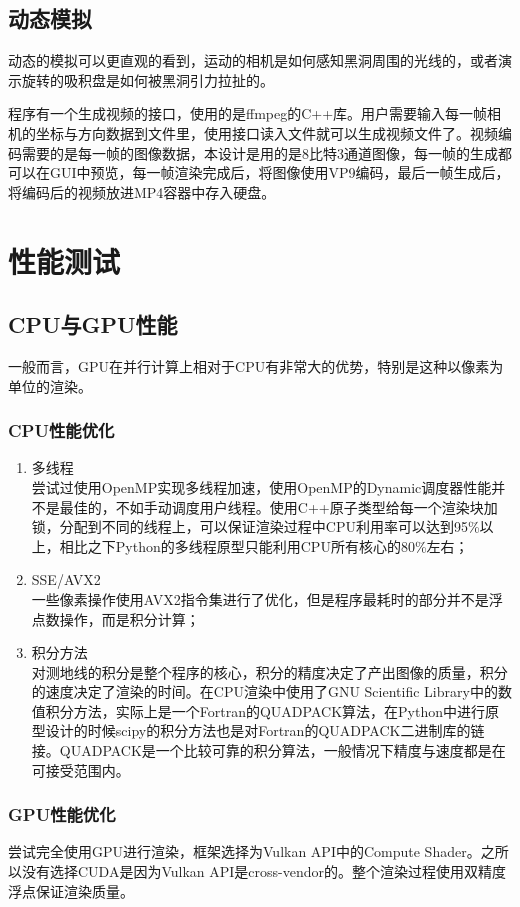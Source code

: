 \subsection{动态模拟}
动态的模拟可以更直观的看到，运动的相机是如何感知黑洞周围的光线的，或者演示旋转的吸积盘是如何被黑洞引力拉扯的。

程序有一个生成视频的接口，使用的是ffmpeg的C++库。用户需要输入每一帧相机的坐标与方向数据到文件里，使用接口读入文件就可以生成视频文件了。视频编码需要的是每一帧的图像数据，本设计是用的是8比特3通道图像，每一帧的生成都可以在GUI中预览，每一帧渲染完成后，将图像使用VP9编码，最后一帧生成后，将编码后的视频放进MP4容器中存入硬盘。

\section{性能测试}
\subsection{CPU与GPU性能}
一般而言，GPU在并行计算上相对于CPU有非常大的优势，特别是这种以像素为单位的渲染。
\subsubsection{CPU性能优化}
\begin{enumerate}
    \item 多线程 \\ 尝试过使用OpenMP实现多线程加速，使用OpenMP的Dynamic调度器性能并不是最佳的，不如手动调度用户线程。使用C++原子类型给每一个渲染块加锁，分配到不同的线程上，可以保证渲染过程中CPU利用率可以达到95\%以上，相比之下Python的多线程原型只能利用CPU所有核心的80\%左右；
    \item SSE/AVX2 \\ 一些像素操作使用AVX2指令集进行了优化，但是程序最耗时的部分并不是浮点数操作，而是积分计算；
    \item 积分方法 \\ 对测地线的积分是整个程序的核心，积分的精度决定了产出图像的质量，积分的速度决定了渲染的时间。在CPU渲染中使用了GNU Scientific Library中的数值积分方法，实际上是一个Fortran的QUADPACK算法，在Python中进行原型设计的时候scipy的积分方法也是对Fortran的QUADPACK二进制库的链接。QUADPACK是一个比较可靠的积分算法，一般情况下精度与速度都是在可接受范围内。
\end{enumerate}

\subsubsection{GPU性能优化}
尝试完全使用GPU进行渲染，框架选择为Vulkan API中的Compute Shader。之所以没有选择CUDA是因为Vulkan API是cross-vendor的。整个渲染过程使用双精度浮点保证渲染质量。

